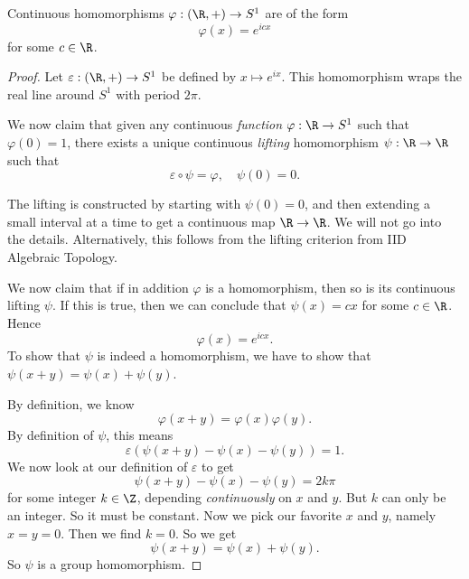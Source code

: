\documentclass[a4paper]{article}
\begin{document}
\begin{lemma}
  Continuous homomorphisms $\varphi: (\R, +) \to S^1$ are of the form
  \[
    \varphi(x) = e^{icx}
  \]
  for some $c \in \R$.
\end{lemma}

\begin{proof}
  Let $\varepsilon: (\R, +) \to S^1$ be defined by $x \mapsto e^{ix}$. This homomorphism wraps the real line around $S^1$ with period $2\pi$.

  We now claim that given any continuous \emph{function} $\varphi: \R \to S^1$ such that $\varphi(0) = 1$, there exists a unique continuous \emph{lifting} homomorphism $\psi: \R \to \R$ such that
  \[
    \varepsilon \circ \psi = \varphi,\quad \psi(0) = 0.
  \]
  \begin{center}
  \end{center}
  The lifting is constructed by starting with $\psi(0) = 0$, and then extending a small interval at a time to get a continuous map $\R \to \R$. We will not go into the details. Alternatively, this follows from the lifting criterion from IID Algebraic Topology.

  We now claim that if in addition $\varphi$ is a homomorphism, then so is its continuous lifting $\psi$. If this is true, then we can conclude that $\psi(x) = cx$ for some $c\in \R$. Hence
  \[
    \varphi(x) = e^{icx}.
  \]
  To show that $\psi$ is indeed a homomorphism, we have to show that $\psi(x + y) = \psi(x) + \psi(y)$.

  By definition, we know
  \[
    \varphi(x + y) = \varphi(x) \varphi(y).
  \]
  By definition of $\psi$, this means
  \[
    \varepsilon(\psi(x + y) - \psi(x) - \psi(y)) = 1.
  \]
  We now look at our definition of $\varepsilon$ to get
  \[
    \psi(x + y) - \psi(x) - \psi(y) = 2 k \pi
  \]
  for some integer $k \in \Z$, depending \emph{continuously} on $x$ and $y$. But $k$ can only be an integer. So it must be constant. Now we pick our favorite $x$ and $y$, namely $x = y = 0$. Then we find $k = 0$. So we get
  \[
    \psi(x + y) = \psi(x) + \psi(y).
  \]
  So $\psi$ is a group homomorphism.
\end{proof}
\end{document}

